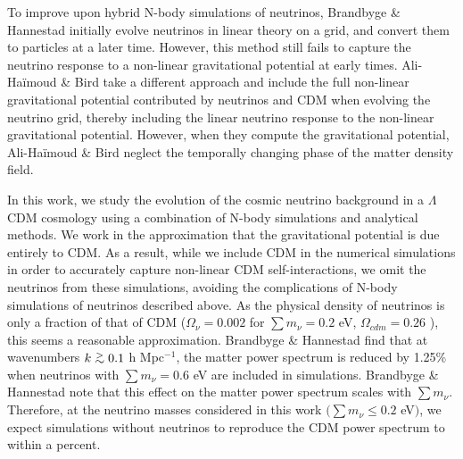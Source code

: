 \documentclass[twocolumn,superscriptaddress,prd]{revtex4}
\def\gtsima{$\; \buildrel > \over \sim \;$}
\def\gsim{\lower.5ex\hbox{\gtsima}}
\begin{document}
To improve upon hybrid N-body simulations of neutrinos,
Brandbyge \& Hannestad \cite{brandbyge09}
initially evolve neutrinos
in linear theory on a grid, and convert them to
particles at a later time.  However, this method still fails to
capture the neutrino response to a non-linear gravitational potential
at early times. Ali-Ha\"imoud \& Bird \cite{yacine12} take a different approach and include
the full non-linear gravitational potential contributed by 
neutrinos and CDM when evolving the neutrino grid, 
thereby including the linear neutrino response to the
non-linear gravitational potential.  
However, when they compute the gravitational
potential, Ali-Ha\"imoud \& Bird \cite{yacine12} neglect the temporally changing phase of the
matter density field.

In this work, we study the evolution of the cosmic neutrino
background in a $\Lambda$CDM
cosmology using a combination of N-body simulations and
analytical methods.  We work in the approximation that the
gravitational potential is due entirely to CDM.  As a
result, while we include CDM in the numerical
simulations in order to accurately capture non-linear 
CDM self-interactions, we omit
the neutrinos from these simulations, avoiding the complications of
N-body simulations of neutrinos described above.  
As the physical
density of neutrinos is only a fraction of that of CDM
($\Omega_\nu = 0.002$ for $\sum m_\nu = 0.2$ eV, $\Omega_{cdm} = 0.26$
\citep{planck15}), this seems a reasonable approximation. 
Brandbyge \& Hannestad \cite{brandbyge08,brandbyge09} find that at wavenumbers $k\gsim 0.1$ h
Mpc$^{-1}$, the matter power spectrum is reduced by
1.25\% when neutrinos with $\sum m_\nu =0.6$ eV are included in
simulations.
Brandbyge \& Hannestad \cite{brandbyge09} 
note that
this effect on the matter power spectrum scales with
$\sum m_\nu$.  Therefore, at the neutrino masses considered in this
work $\big(\sum m_\nu \leq 0.2$ eV$\big)$, we expect simulations without
neutrinos to reproduce the CDM power spectrum to within
a percent.
\end{document}

